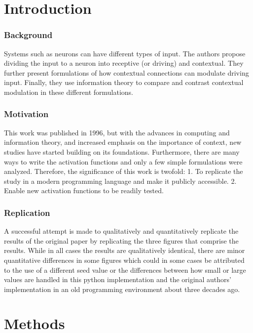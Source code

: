 \section{Introduction}


\subsubsection{Background}
Systems such as neurons can have different types of input. The authors\supercite{Smyth:1996} propose dividing the input to a neuron into receptive (or driving) and contextual. They further present formulations of how contextual connections can modulate driving input. Finally, they use information theory to compare and contrast contextual modulation in these different formulations.

\subsubsection{Motivation}
This work was published in 1996, but with the advances in computing and information theory, and increased emphasis on the importance of context\supercite{Larkum:2013}, new studies\supercite{Kay:2011,Wibral:2017} have started building on its foundations. Furthermore, there are many ways to write the activation functions and only a few simple formulations were analyzed. Therefore, the significance of this work is twofold: 1. To replicate the study in a modern programming language and make it publicly accessible.   2. Enable new activation functions to be readily tested.

\subsubsection{Replication}
A successful attempt is made to qualitatively and quantitatively replicate the results of the original paper by replicating the three figures that comprise the results. While in all cases the results are qualitatively identical, there are minor quantitative differences in some figures which could in some cases be attributed to the use of a different seed value or the differences between how small or large values are handled in this python implementation and the original authors' implementation in an old programming environment about three decades ago. 

\section{Methods}

